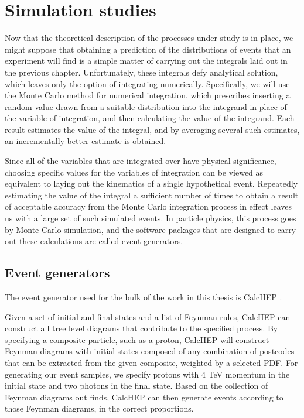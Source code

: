 \chapter{Simulation studies}\label{ch.mc}

Now that the theoretical description of the processes under study is in place, we might suppose that obtaining a prediction of the distributions of events that an experiment will find is a simple matter of carrying out the integrals laid out in the previous chapter. Unfortunately, these integrals defy analytical solution, which leaves only the option of integrating numerically. Specifically, we will use the Monte Carlo method for numerical integration, which prescribes inserting a random value drawn from a suitable distribution into the integrand in place of the variable of integration, and then calculating the value of the integrand. Each result estimates the value of the integral, and by averaging several such estimates, an incrementally better estimate is obtained.

Since all of the variables that are integrated over have physical significance, choosing specific values for the variables of integration can be viewed as equivalent to laying out the kinematics of a single hypothetical event. Repeatedly estimating the value of the integral a sufficient number of times to obtain a result of acceptable accuracy from the Monte Carlo integration process in effect leaves us with a large set of such simulated events. In particle physics, this process goes by Monte Carlo simulation, and the software packages that are designed to carry out these calculations are called event generators.

\section{Event generators}

The event generator used for the bulk of the work in this thesis is CalcHEP \cite{calchep}.

Given a set of initial and final states and a list of Feynman rules, CalcHEP can construct all tree level diagrams that contribute to the specified process. By specifying a composite particle, such as a proton, CalcHEP will construct Feynman diagrams with initial states composed of any combination of postcodes that can be extracted from the given composite, weighted by a selected PDF. For generating our event samples, we specify protons with 4 TeV momentum in the initial state and two photons in the final state. Based on the collection of Feynman diagrams out finds, CalcHEP can then generate events according to those Feynman diagrams, in the correct proportions.

